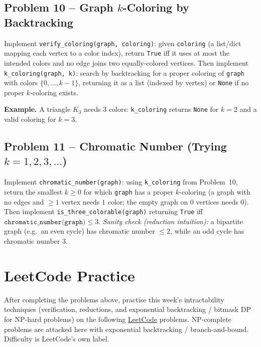 \documentclass[11pt]{article}
\begin{document}
\subsection*{Problem 10 -- Graph $k$-Coloring by Backtracking}

Implement \texttt{verify\_coloring(graph, coloring)}: given \texttt{coloring} (a list/dict
mapping each vertex to a color index), return \texttt{True} iff it uses at most the intended
colors and no edge joins two equally-colored vertices. Then implement
\texttt{k\_coloring(graph, k)}: search by backtracking for a proper coloring of
\texttt{graph} with colors $\{0, \ldots, k-1\}$, returning it as a list (indexed by vertex)
or \texttt{None} if no proper $k$-coloring exists.

\textbf{Example.} A triangle $K_3$ needs 3 colors: \texttt{k\_coloring} returns
\texttt{None} for $k = 2$ and a valid coloring for $k = 3$.

\subsection*{Problem 11 -- Chromatic Number (Trying $k = 1, 2, 3, \ldots$)}

Implement \texttt{chromatic\_number(graph)}: using \texttt{k\_coloring} from Problem~10,
return the smallest $k \ge 0$ for which \texttt{graph} has a proper $k$-coloring (a graph
with no edges and $\ge 1$ vertex needs $1$ color; the empty graph on $0$ vertices needs
$0$). Then implement \texttt{is\_three\_colorable(graph)} returning \texttt{True} iff
$\texttt{chromatic\_number(graph)} \le 3$. \emph{Sanity check (reduction intuition):} a
bipartite graph (e.g.\ an even cycle) has chromatic number $\le 2$, while an odd cycle has
chromatic number $3$.

\newpage
\section{LeetCode Practice}

After completing the problems above, practise this week's intractability techniques
(verification, reductions, and exponential backtracking / bitmask DP for NP-hard problems)
on the following \href{https://leetcode.com}{LeetCode} problems. NP-complete problems are
attacked here with exponential backtracking / branch-and-bound. Difficulty is LeetCode's
own label.
\end{document}
